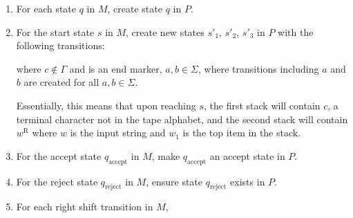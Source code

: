 \documentclass{article}
\begin{document}
    \begin{enumerate}[-]
        \item For each state $q$ in $M$, create state $q$ in $P$.

        \item For the start state $s$ in $M$, create new states $s'_1$, $s'_2$, $s'_3$ in $P$ with the following transitions:
            \begin{center}
            \end{center}

            where $c \notin \Gamma$ and is an end marker, $a, b \in \Sigma$, where transitions including $a$ and $b$ are created for all $a, b \in \Sigma$.

            Essentially, this means that upon reaching $s$, the first stack will contain $c$, a terminal character not in the tape alphabet, and the second stack will contain $w^\text{R}$ where $w$ is the input string and $w_1$ is the top item in the stack.

        \item For the accept state $q_\text{accept}$ in $M$, make $q_\text{accept}$ an accept state in $P$.

        \item For the reject state $q_\text{reject}$ in $M$, ensure state $q_\text{reject}$ exists in $P$.

        \item For each right shift transition in $M$, 
            \begin{center}
\end{center}
\end{enumerate}
\end{document}
